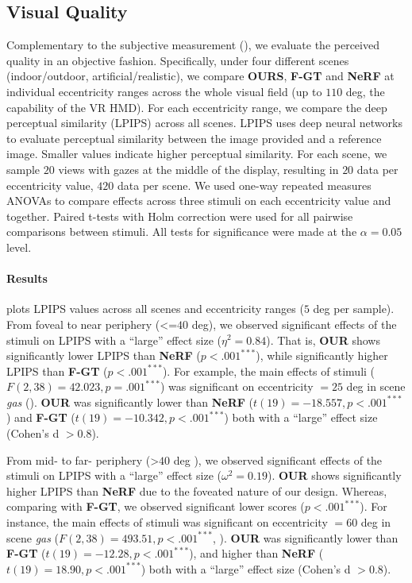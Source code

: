 \subsection{Visual Quality}
\label{sec:study:quality}
Complementary to the subjective measurement (), we evaluate the perceived quality in an objective fashion. Specifically, under four different scenes (indoor/outdoor, artificial/realistic), we compare {\bf OURS}, {\bf F-GT} and {\bf NeRF} at individual eccentricity ranges across the whole visual field (up to $110$ deg, the capability of the VR HMD). 
For each eccentricity range, we compare the deep perceptual similarity (LPIPS) \cite{zhang2018unreasonable} across all scenes. LPIPS uses deep neural networks to evaluate perceptual similarity between the image provided and a reference image. Smaller values indicate higher perceptual similarity.
For each scene, we sample $20$ views with gazes at the middle of the display, resulting in $20$ data per eccentricity value, $420$ data per scene. We used one-way repeated measures ANOVAs to compare effects across three stimuli on each eccentricity value and together. Paired t-tests with Holm correction were used for all pairwise comparisons between stimuli. All tests for significance were made at the $\alpha=0.05$ level. 

\paragraph{Results} 
 plots LPIPS values across all scenes and eccentricity ranges ($5$ deg per sample). 
From foveal to near periphery (<=$40$ deg), we observed significant effects of the stimuli on LPIPS with a ``large'' effect size ($\eta^2 = 0.84$). That is, \textbf{OUR} shows significantly lower LPIPS than \textbf{NeRF} ($p<.001^{***}$), while significantly higher LPIPS than \textbf{F-GT} ($p<.001^{***}$).
For example, the main effects of stimuli ($F(2,38)=42.023, p=.001^{***}$) was significant on eccentricity $=25$  deg  in scene \textit{gas} (). \textbf{OUR} was significantly lower than \textbf{NeRF} ($t(19)=-18.557, p<.001^{***}$) and \textbf{F-GT} ($t(19)=-10.342, p<.001^{***}$) both with a ``large'' effect size (Cohen's d $>0.8$). 

From mid- to far- periphery (>$40$ deg ), we observed significant effects of the stimuli on LPIPS with a ``large'' effect size ($\omega^2 = 0.19$). \textbf{OUR} shows significantly higher LPIPS than \textbf{NeRF} due to the foveated nature of our design. Whereas, comparing with \textbf{F-GT}, we observed  significant lower scores ($p<.001^{***}$).
For instance, the main effects of stimuli was significant on eccentricity $=60$ deg in scene \textit{gas} ($F(2,38)=493.51, p<.001^{***}$, ). \textbf{OUR} was significantly lower than \textbf{F-GT} ($t(19)=-12.28, p<.001^{***}$), and higher than \textbf{NeRF} ($t(19)=18.90, p<.001^{***}$) both with a ``large'' effect size (Cohen's d $>0.8$). 

